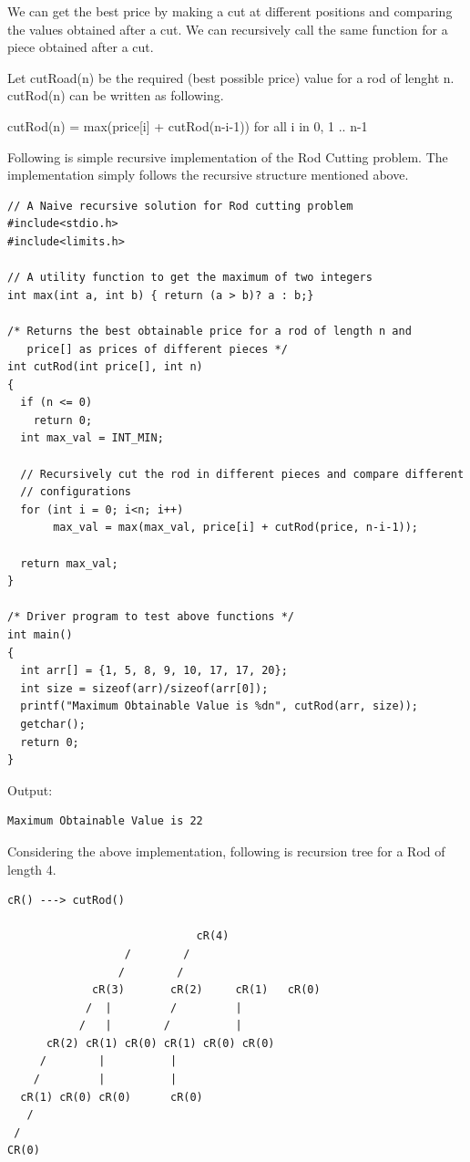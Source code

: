 We can get the best price by making a cut at different positions and
comparing the values obtained after a cut. We can recursively call the same
function for a piece obtained after a cut.

Let cutRoad(n) be the required (best possible price) value for a rod of
lenght n. cutRod(n) can be written as following.

cutRod(n) = max(price[i] + cutRod(n-i-1)) for all i in {0, 1 .. n-1}


Following is simple recursive implementation of the Rod Cutting problem. The
implementation simply follows the recursive structure mentioned above.

\begin{lstlisting}[style=raycppnewsnippet]
// A Naive recursive solution for Rod cutting problem
#include<stdio.h>
#include<limits.h>
 
// A utility function to get the maximum of two integers
int max(int a, int b) { return (a > b)? a : b;}
 
/* Returns the best obtainable price for a rod of length n and
   price[] as prices of different pieces */
int cutRod(int price[], int n)
{
  if (n <= 0)
    return 0;
  int max_val = INT_MIN;
 
  // Recursively cut the rod in different pieces and compare different 
  // configurations
  for (int i = 0; i<n; i++)
       max_val = max(max_val, price[i] + cutRod(price, n-i-1));
 
  return max_val;
}
 
/* Driver program to test above functions */
int main()
{
  int arr[] = {1, 5, 8, 9, 10, 17, 17, 20};
  int size = sizeof(arr)/sizeof(arr[0]);
  printf("Maximum Obtainable Value is %dn", cutRod(arr, size));
  getchar();
  return 0;
}
\end{lstlisting}
Output:
\begin{lstlisting}[style=rayio]
Maximum Obtainable Value is 22
\end{lstlisting}
Considering the above implementation, following is recursion tree for a Rod
of length 4.
\begin{lstlisting}[style=raygeneric]
cR() ---> cutRod() 

                             cR(4)
                  /        /           
                 /        /              
             cR(3)       cR(2)     cR(1)   cR(0)
            /  |         /         |
           /   |        /          |  
      cR(2) cR(1) cR(0) cR(1) cR(0) cR(0)
     /        |          |
    /         |          |   
  cR(1) cR(0) cR(0)      cR(0)
   /
 /
CR(0)
\end{lstlisting}
